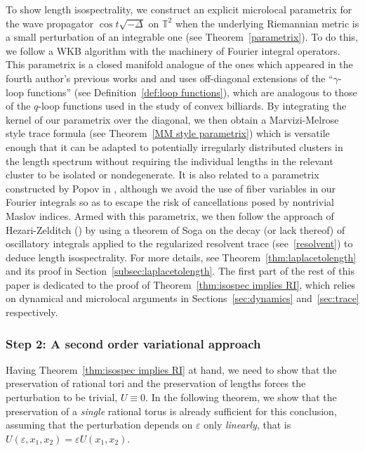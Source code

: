 \documentclass[11pt,letterpaper,oneside]{amsart}
\newcommand{\T}{\mathbb{T}}
\renewcommand{\epsilon}{\varepsilon}
\theoremstyle{definition}
\theoremstyle{remark}
\theoremstyle{definition}
\theoremstyle{remark}
\begin{document}
\medskip

To show length isospectrality, we construct an explicit microlocal parametrix for the wave propagator $\cos t \sqrt{-\Delta}$ on $\T^2$ when the underlying Riemannian metric is a small perturbation of an integrable one (see Theorem~\ref{parametrix}). To do this, we follow a WKB algorithm with the machinery of Fourier integral operators. This parametrix is a closed manifold analogue of the ones which appeared in the fourth author's previous works \cite{Vig21} and \cite{Vig22} and uses off-diagonal extensions of the ``$\gamma$-loop functions'' (see Definition~\ref{def:loop functions}), which are analogous to those of the $q$-loop functions used in the study of convex billiards. By integrating the kernel of our parametrix over the diagonal, we then obtain a Marvizi-Melrose style trace formula (see Theorem~\ref{MM style parametrix}) which is versatile enough that it can be adapted to potentially irregularly distributed clusters in the length spectrum without requiring the individual lengths in the relevant cluster to be isolated or nondegenerate. It is also related to a parametrix constructed by Popov in \cite{PopovDegenerate}, although we avoid the use of fiber variables in our Fourier integrals so as to escape the risk of cancellations posed by nontrivial Maslov indices. Armed with this parametrix, we then follow the approach of Hezari-Zelditch (\cite{HeZe19}) by using a theorem of Soga on the decay (or lack thereof) of oscillatory integrals applied to the regularized resolvent trace (see~\eqref{resolvent}) to deduce length isospectrality. For more details, see Theorem~\ref{thm:laplacetolength} and its proof in Section~\ref{subsec:laplacetolength}. The first part of the rest of this paper is dedicated to the proof of Theorem~\ref{thm:isospec implies RI}, which relies on dynamical and microlocal arguments in Sections~\ref{sec:dynamics} and~\ref{sec:trace} respectively.


\subsubsection*{Step 2: A second order variational approach} Having Theorem~\ref{thm:isospec implies RI} at hand, we need to show that the preservation of rational tori and the preservation of lengths forces the perturbation to be trivial, $U \equiv 0$. In the following theorem, we show that the preservation of a \emph{single} rational torus is already sufficient for this conclusion, assuming that the perturbation depends on $\epsilon$ only \textit{linearly}, that is $U(\epsilon, x_1, x_2) = \epsilon U(x_1, x_2)$.
\end{document}
